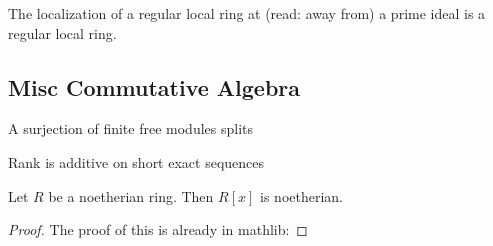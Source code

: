 

\begin{lemma} \label{thm:regular_rings_localize}
	The localization of a regular local ring at (read: away from) a prime 
	ideal is a regular local ring.
\end{lemma}



\subsection{Misc Commutative Algebra}

\begin{lemma}
  \label{lem:finite_free_surj_splits}
  A surjection of finite free modules splits
\end{lemma}

\begin{lemma}
  \label{lem:rank_additive_exact_seq}
  Rank is additive on short exact sequences
\end{lemma}

\begin{theorem}
  \label{thm:hilbert_basis}
  Let $R$ be a noetherian ring.
  Then $R[x]$ is noetherian.
\end{theorem}

\begin{proof}
  The proof of this is already in mathlib:
\end{proof}


